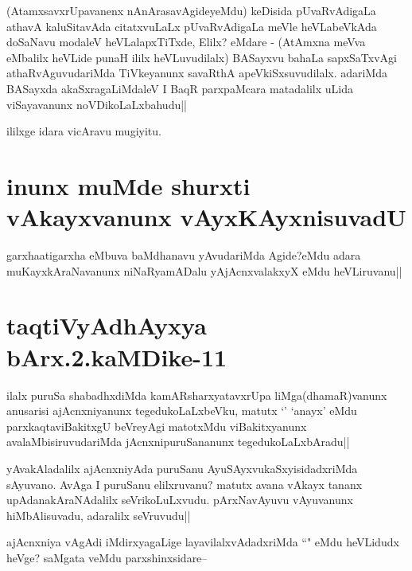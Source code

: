\begin{artha}
(AtamxsavxrUpavanenx nAnArasavAgideyeMdu) keDisida pUvaRvAdigaLa athavA kaluSitavAda citatxvuLaLx pUvaRvAdigaLa meVle heVLabeVkAda doSaNavu modaleV heVLalapxTiTxde, Elilx? eMdare - (AtAmxna meVva eMbalilx heVLide punaH ililx heVLuvudilalx) BASayxvu bahaLa sapxSaTxvAgi athaRvAguvudariMda TiVkeyanunx savaRthA apeVkiSxsuvudilalx. adariMda BASayxda akaSxragaLiMdaleV I BaqR parxpaMcara matadalilx uLida viSayavanunx noVDikoLaLxbahudu||
\end{artha}

\begin{center}
ililxge idara vicAravu mugiyitu.
\end{center}

\section*{inunx muMde shurxti vAkayxvanunx vAyxKAyxnisuvadU}


\begin{artha}
garxhaatigarxha eMbuva baMdhanavu yAvudariMda Agide?eMdu adara muKayxkAraNavanunx niNaRyamADalu yAjAcnxvalakxyX eMdu heVLiruvanu||
\end{artha}

\section*{taqtiVyAdhAyxya bArx.2.kaMDike-11}

\begin{artha}
ilalx puruSa shabadhxdiMda kamARsharxyatavxrUpa liMga(dhamaR)vanunx anusarisi ajAcnxniyanunx tegedukoLaLxbeVku, matutx `\stext' `anayx' eMdu parxkaqtaviBakitxgU beVreyAgi matotxMdu viBakitxyanunx avalaMbisiruvudariMda jAcnxnipuruSananunx tegedukoLaLxbAradu||
\end{artha}

\begin{artha}
yAvakAladalilx ajAcnxniyAda puruSanu AyuSAyxvukaSxyisidadxriMda sAyuvano. AvAga I puruSanu elilxruvanu? matutx avana vAkayx tananx upAdanakAraNAdalilx seVrikoLuLxvudu. pArxNavAyuvu vAyuvanunx hiMbAlisuvadu, adaralilx seVruvudu||
\end{artha}

\begin{artha}
ajAcnxniya vAgAdi iMdirxyagaLige layavilalxvAdadxriMda ``\stext" eMdu heVLidudx heVge? saMgata veMdu parxshinxsidare--
\end{artha}

